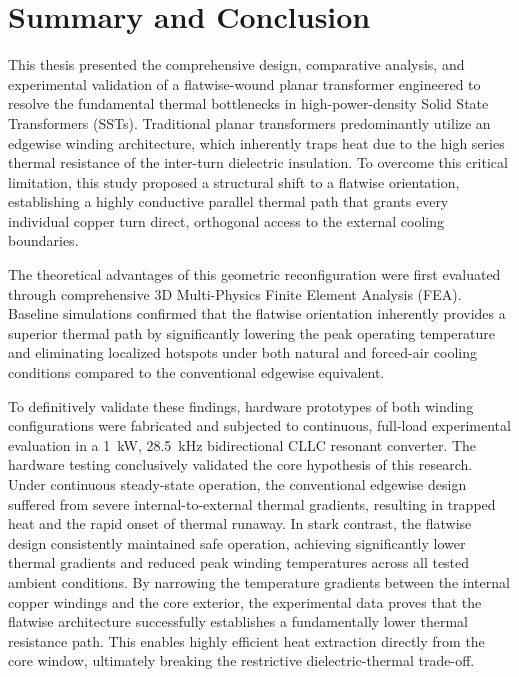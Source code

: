 \section{Summary and Conclusion}
This thesis presented the comprehensive design, comparative analysis, and experimental validation of a flatwise-wound planar transformer engineered to resolve the fundamental thermal bottlenecks in high-power-density Solid State Transformers (SSTs). Traditional planar transformers predominantly utilize an edgewise winding architecture, which inherently traps heat due to the high series thermal resistance of the inter-turn dielectric insulation. To overcome this critical limitation, this study proposed a structural shift to a flatwise orientation, establishing a highly conductive parallel thermal path that grants every individual copper turn direct, orthogonal access to the external cooling boundaries.

The theoretical advantages of this geometric reconfiguration were first evaluated through comprehensive 3D Multi-Physics Finite Element Analysis (FEA). Baseline simulations confirmed that the flatwise orientation inherently provides a superior thermal path by significantly lowering the peak operating temperature and eliminating localized hotspots under both natural and forced-air cooling conditions compared to the conventional edgewise equivalent. 

To definitively validate these findings, hardware prototypes of both winding configurations were fabricated and subjected to continuous, full-load experimental evaluation in a 1~kW, 28.5~kHz bidirectional CLLC resonant converter. The hardware testing conclusively validated the core hypothesis of this research. Under continuous steady-state operation, the conventional edgewise design suffered from severe internal-to-external thermal gradients, resulting in trapped heat and the rapid onset of thermal runaway. In stark contrast, the flatwise design consistently maintained safe operation, achieving significantly lower thermal gradients and reduced peak winding temperatures across all tested ambient conditions. By narrowing the temperature gradients between the internal copper windings and the core exterior, the experimental data proves that the flatwise architecture successfully establishes a fundamentally lower thermal resistance path. This enables highly efficient heat extraction directly from the core window, ultimately breaking the restrictive dielectric-thermal trade-off.

